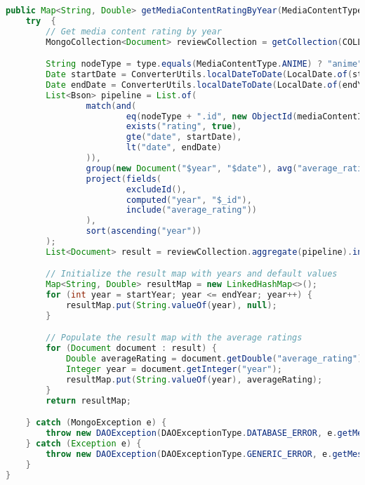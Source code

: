 \begin{mdframed}[style=customstyle]
\begin{lstlisting}[language=java]
public Map<String, Double> getMediaContentRatingByYear(MediaContentType type, String mediaContentId, int startYear, int endYear) throws  DAOException {
    try  {
        // Get media content rating by year
        MongoCollection<Document> reviewCollection = getCollection(COLLECTION_NAME);

        String nodeType = type.equals(MediaContentType.ANIME) ? "anime" : "manga";
        Date startDate = ConverterUtils.localDateToDate(LocalDate.of(startYear, 1, 1));
        Date endDate = ConverterUtils.localDateToDate(LocalDate.of(endYear + 1, 1, 1));
        List<Bson> pipeline = List.of(
                match(and(
                        eq(nodeType + ".id", new ObjectId(mediaContentId)),
                        exists("rating", true),
                        gte("date", startDate),
                        lt("date", endDate)
                )),
                group(new Document("$year", "$date"), avg("average_rating", "$rating")),
                project(fields(
                        excludeId(),
                        computed("year", "$_id"),
                        include("average_rating"))
                ),
                sort(ascending("year"))
        );
        List<Document> result = reviewCollection.aggregate(pipeline).into(new ArrayList<>());

        // Initialize the result map with years and default values
        Map<String, Double> resultMap = new LinkedHashMap<>();
        for (int year = startYear; year <= endYear; year++) {
            resultMap.put(String.valueOf(year), null);
        }

        // Populate the result map with the average ratings
        for (Document document : result) {
            Double averageRating = document.getDouble("average_rating");
            Integer year = document.getInteger("year");
            resultMap.put(String.valueOf(year), averageRating);
        }
        return resultMap;

    } catch (MongoException e) {
        throw new DAOException(DAOExceptionType.DATABASE_ERROR, e.getMessage());
    } catch (Exception e) {
        throw new DAOException(DAOExceptionType.GENERIC_ERROR, e.getMessage());
    }
}\end{lstlisting}
\end{mdframed}
    
\newpage

